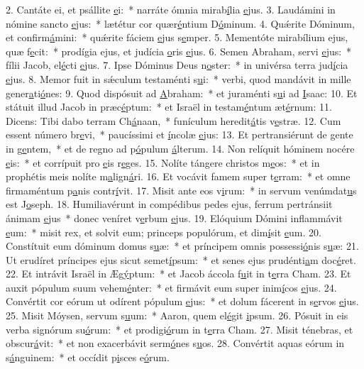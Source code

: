 2. Cantáte ei, et psállite \uline{e}i:~* narráte ómnia mirab\uline{í}lia \uline{e}jus.
3. Laudámini in nómine sancto \uline{e}jus:~* lætétur cor quær\uline{é}ntium D\uline{ó}minum.
4. Quǽrite Dóminum, et confirm\uline{á}mini:~* quǽrite fáciem \uline{e}jus s\uline{e}mper.
5. Mementóte mirabílium ejus, quæ f\uline{e}cit:~* prodígia ejus, et judícia \uline{o}ris \uline{e}jus.
6. Semen Abraham, servi \uline{e}jus:~* fílii Jacob, el\uline{é}cti \uline{e}jus.
7. Ipse Dóminus Deus n\uline{o}ster:~* in univérsa terra jud\uline{í}cia \uline{e}jus.
8. Memor fuit in sǽculum testaménti s\uline{u}i:~* verbi, quod mandávit in mille gener\uline{a}ti\uline{ó}nes:
9. Quod dispósuit ad \uline{A}braham:~* et juraménti s\uline{u}i ad \uline{I}saac:
10. Et státuit illud Jacob in præc\uline{é}ptum:~* et Israël in testam\uline{é}ntum æt\uline{é}rnum:
11. Dicens: Tibi dabo terram Ch\uline{á}naan,~* funículum heredit\uline{á}tis v\uline{e}stræ.
12. Cum essent número br\uline{e}vi,~* paucíssimi et \uline{í}ncolæ \uline{e}jus:
13. Et pertransiérunt de gente in g\uline{e}ntem,~* et de regno ad p\uline{ó}pulum \uline{á}lterum.
14. Non relíquit hóminem nocére \uline{e}is:~* et corrípuit pro \uline{e}is r\uline{e}ges.
15. Nolíte tángere christos m\uline{e}os:~* et in prophétis meis nolíte m\uline{a}lign\uline{á}ri.
16. Et vocávit famem super t\uline{e}rram:~* et omne firmaméntum p\uline{a}nis contr\uline{í}vit.
17. Misit ante eos v\uline{i}rum:~* in servum venúmdat\uline{u}s est J\uline{o}seph.
18. Humiliavérunt in compédibus pedes ejus, ferrum pertránsiit ánimam \uline{e}jus~* donec veníret v\uline{e}rbum \uline{e}jus.
19. Elóquium Dómini inflammávit \uline{e}um:~* misit rex, et solvit eum; princeps populórum, et dim\uline{í}sit \uline{e}um.
20. Constítuit eum dóminum domus s\uline{u}æ:~* et príncipem omnis possessi\uline{ó}nis s\uline{u}æ:
21. Ut erudíret príncipes ejus sicut semet\uline{í}psum:~* et senes ejus prudénti\uline{a}m doc\uline{é}ret.
22. Et intrávit Israël in Æg\uline{ý}ptum:~* et Jacob áccola f\uline{u}it in t\uline{e}rra Cham.
23. Et auxit pópulum suum vehem\uline{é}nter:~* et firmávit eum super inim\uline{í}cos \uline{e}jus.
24. Convértit cor eórum ut odírent pópulum \uline{e}jus:~* et dolum fácerent in s\uline{e}rvos \uline{e}jus.
25. Misit Móysen, servum s\uline{u}um:~* Aaron, quem el\uline{é}git \uline{i}psum.
26. Pósuit in eis verba signórum su\uline{ó}rum:~* et prodigi\uline{ó}rum in t\uline{e}rra Cham.
27. Misit ténebras, et obscur\uline{á}vit:~* et non exacerbávit serm\uline{ó}nes s\uline{u}os.
28. Convértit aquas eórum in s\uline{á}nguinem:~* et occídit p\uline{i}sces e\uline{ó}rum.
